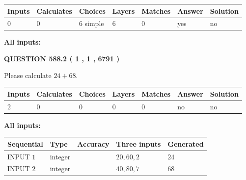 \documentclass[12pt]{article}
\begin{document}
 
   
   
   
   
\noindent\begin{tabular}{|l|l|l|l|l|l|l|}
 \hline
Inputs & Calculates & Choices & Layers & Matches & Answer & Solution \\ \hline
 0  & 
 0  & 
 6
  simple  
  & 
 6  & 
 0  & 
  yes & 
  no 
  \\ \hline
 \end{tabular}
   
   
   
   
\noindent{}
   
   
   
   
\noindent\vspace{0.1in}\hspace{-0.08in} {\textbf{\Large{All inputs: }}}
   
   
  
\vspace{0.2in}
  
{\textbf{\Large{QUESTION
588.2 
 ( 1 , 1 , 6791 )
}}}
  
  
 
Please calculate $ %
24 +  %
68 $.
 
 
   
   
   
   
\noindent\begin{tabular}{|l|l|l|l|l|l|l|}
 \hline
Inputs & Calculates & Choices & Layers & Matches & Answer & Solution \\ \hline
 2  & 
 0  & 
 0
  & 
 0  & 
 0  & 
  no & 
  no 
  \\ \hline
 \end{tabular}
   
   
   
   
\noindent{}
   
   
   
   
\noindent\vspace{0.1in}\hspace{-0.08in} {\textbf{\Large{All inputs: }}}
   
   
  
  
\noindent\begin{tabular}{|l|l|l|l|l|}
\hline
 Sequential & Type & Accuracy & Three inputs & Generated \\ 
\hline
 
 
  INPUT $  1 $ & integer &  & $
 20
 , 
 60
 , 
 2
 $ & $ 24 $ 
 \\  \hline  
 
 
  INPUT $  2 $ & integer &  & $
 40
 , 
 80
 , 
 7
 $ & $ 68 $ 
 \\  \hline  
 \end{tabular}
   
\end{document}
